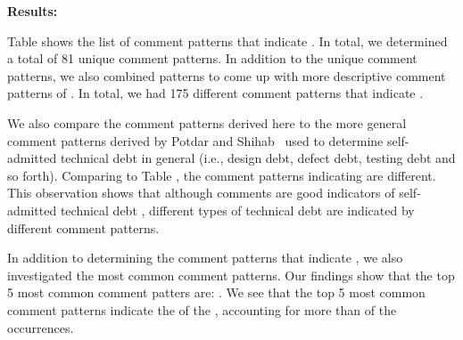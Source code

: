 \noindent \textbf{Results:} 

Table  shows the list of comment patterns that indicate \SADTD. In total, we determined a total of 81 unique comment patterns. In addition to the unique comment patterns, we also combined patterns to come up with more descriptive comment patterns of \SADTD. In total, we had 175 different comment patterns that indicate \SADTD. 

We also compare the comment patterns derived here to the more general comment patterns derived by Potdar and Shihab~ used to determine self-admitted technical debt in general (i.e., design debt, defect debt, testing debt and so forth). Comparing to Table , the comment patterns indicating \SADTD are different. This observation shows that although comments are good indicators of self-admitted technical debt , different types of technical debt are indicated by different comment patterns.

In addition to determining the comment patterns that indicate \SADTD, we also investigated the most common \SADTD comment patterns. Our findings show that the top 5 most common \SADTD comment patters are: . We see that the top 5 most common comment patterns indicate the  of the \SADTD, accounting for more than  of the \SADTD occurrences.


%
%
%
%

